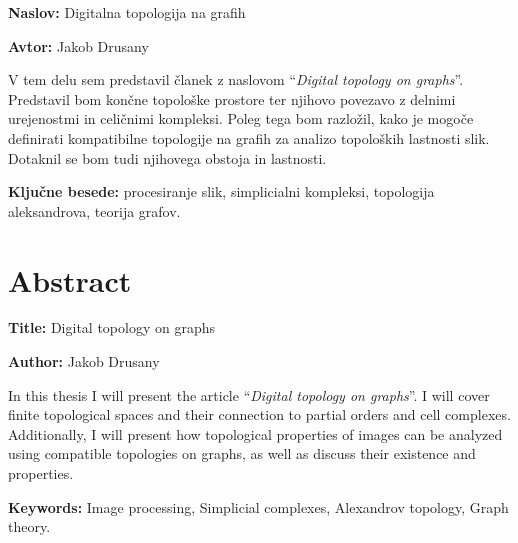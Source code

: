 \documentclass[a4paper, 12pt]{book}
\newcommand{\ttitle}{Digitalna topologija na grafih}
\newcommand{\ttitleEn}{Digital topology on graphs}
\newcommand{\tauthor}{Jakob Drusany}
\newcommand{\tkeywords}{procesiranje slik, simplicialni kompleksi, topologija aleksandrova, teorija grafov}
\newcommand{\tkeywordsEn}{Image processing, Simplicial complexes, Alexandrov topology, Graph theory}
\newcommand{\clearemptydoublepage}{\newpage{\pagestyle{empty}\cleardoublepage}}
\theoremstyle{definition}
\theoremstyle{remark}
\begin{document}
\noindent\textbf{Naslov:} \ttitle
\bigskip

\noindent\textbf{Avtor:} \tauthor
\bigskip

\noindent V tem delu sem predstavil članek z naslovom ``\textit{Digital topology on graphs}''.   
Predstavil bom končne topološke prostore ter njihovo povezavo z delnimi
urejenostmi in celičnimi kompleksi. Poleg tega bom razložil, kako je mogoče
definirati kompatibilne topologije na grafih za analizo topoloških lastnosti slik.
Dotaknil se bom tudi njihovega obstoja in lastnosti.

\bigskip

\noindent\textbf{Ključne besede:} \tkeywords.
\clearemptydoublepage

\chapter*{Abstract}

\noindent\textbf{Title:} \ttitleEn
\bigskip

\noindent\textbf{Author:} \tauthor
\bigskip

\noindent In this thesis I will present the article ``\textit{Digital topology on graphs}''.
I will cover finite topological spaces and their connection to partial
orders and cell complexes. Additionally, I will present how topological
properties of images can be analyzed using compatible topologies on graphs, as well
as discuss their existence and properties.

\bigskip

\noindent\textbf{Keywords:} \tkeywordsEn.
\clearemptydoublepage
\fi
\mainmatter
\setcounter{page}{1}
\pagestyle{fancy}
\end{document}
